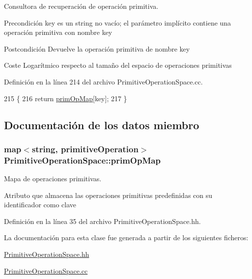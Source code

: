 Consultora de recuperación de operación primitiva. 

\begin{DoxyPrecond}{Precondición}
\textquotesingle{}key\textquotesingle{} es un string no vacío; el parámetro implícito contiene una operación primitiva con nombre \textquotesingle{}key\textquotesingle{} 
\end{DoxyPrecond}
\begin{DoxyPostcond}{Postcondición}
Devuelve la operación primitiva de nombre \textquotesingle{}key\textquotesingle{} 
\end{DoxyPostcond}
\begin{DoxyParagraph}{Coste}
Logarítmico respecto al tamaño del espacio de operaciones primitivas 
\end{DoxyParagraph}


Definición en la línea 214 del archivo Primitive\+Operation\+Space.\+cc.


\begin{DoxyCode}
215 \{
216   \textcolor{keywordflow}{return} \hyperlink{class_primitive_operation_space_afd359615001ed1e9b44b9618287834ec}{primOpMap}[key];
217 \}
\end{DoxyCode}


\subsection{Documentación de los datos miembro}
\subsubsection[{\texorpdfstring{prim\+Op\+Map}{primOpMap}}]{\setlength{\rightskip}{0pt plus 5cm}map$<$string, {\bf primitive\+Operation}$>$ Primitive\+Operation\+Space\+::prim\+Op\+Map\hspace{0.3cm}{\ttfamily [private]}}\hypertarget{class_primitive_operation_space_afd359615001ed1e9b44b9618287834ec}{}\label{class_primitive_operation_space_afd359615001ed1e9b44b9618287834ec}


Mapa de operaciones primitivas. 

Atributo que almacena las operaciones primitivas predefinidas con su identificador como clave 

Definición en la línea 35 del archivo Primitive\+Operation\+Space.\+hh.



La documentación para esta clase fue generada a partir de los siguientes ficheros\+:\begin{DoxyCompactItemize}
\item 
\hyperlink{_primitive_operation_space_8hh}{Primitive\+Operation\+Space.\+hh}\item 
\hyperlink{_primitive_operation_space_8cc}{Primitive\+Operation\+Space.\+cc}\end{DoxyCompactItemize}
